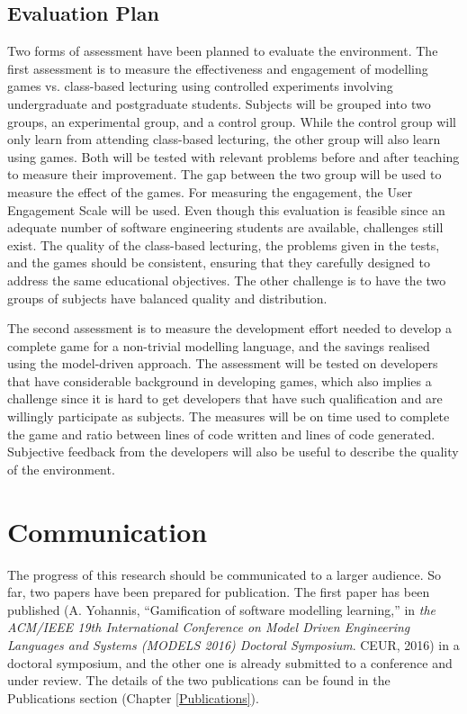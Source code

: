 \documentclass[12pt, a4paper]{report} \usepackage[titletoc]{appendix}
\begin{document}
\subsection{Evaluation Plan}
\label{Evaluation Plan}
Two forms of assessment have been planned to evaluate the environment. The first assessment is to measure the effectiveness and engagement of modelling games vs. class-based lecturing using controlled experiments involving undergraduate and postgraduate students. Subjects will be grouped into two groups, an experimental group, and a control group. While the control group will only learn from attending class-based lecturing, the other group will also learn using games. Both will be tested with relevant problems before and after teaching to measure their improvement. The gap between the two group will be used to measure the effect of the games. For measuring the engagement, the User Engagement Scale \cite{wiebe2014measuring} will be used. Even though this evaluation is feasible since an adequate number of software engineering students are available, challenges still exist. The quality of the class-based lecturing, the problems given in the tests, and the games should be consistent, ensuring that they carefully designed to address the same educational objectives. The other challenge is to have the two groups of subjects have balanced quality and distribution. 
 
The second assessment is to measure the development effort needed to develop a complete game for a non-trivial modelling language, and the savings realised using the model-driven approach. The assessment will be tested on developers that have considerable background in developing games, which also implies a challenge since it is hard to get developers that have such qualification and are willingly participate as subjects. The measures will be on time used to complete the game and ratio between lines of code written and lines of code generated. Subjective feedback from the developers will also be useful to describe the quality of the environment. 

\section{Communication}
The progress of this research should be communicated to a larger audience. So far, two papers have been prepared for publication. The first paper \cite{Yohannis2016} has been published (A. Yohannis, “Gamiﬁcation of software modelling learning,” in \textit{the ACM/IEEE 19th International Conference on Model Driven Engineering Languages and Systems (MODELS 2016) Doctoral Symposium}. CEUR, 2016) in a doctoral symposium, and the other one is already submitted to a conference and under review. The details of the two publications can be found in the Publications section (Chapter \ref{Publications}).
\end{document}
